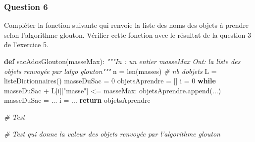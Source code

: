 \documentclass[
  paper=a4,
  ,captions=tableheading
]{scrartcl}
\newenvironment{Shaded}{}{}
\newcommand{\BuiltInTok}[1]{\textcolor[rgb]{0.00,0.50,0.00}{#1}}
\newcommand{\CommentTok}[1]{\textcolor[rgb]{0.38,0.63,0.69}{\textit{#1}}}
\newcommand{\ControlFlowTok}[1]{\textcolor[rgb]{0.00,0.44,0.13}{\textbf{#1}}}
\newcommand{\DecValTok}[1]{\textcolor[rgb]{0.25,0.63,0.44}{#1}}
\newcommand{\KeywordTok}[1]{\textcolor[rgb]{0.00,0.44,0.13}{\textbf{#1}}}
\newcommand{\NormalTok}[1]{#1}
\newcommand{\OperatorTok}[1]{\textcolor[rgb]{0.40,0.40,0.40}{#1}}
\newcommand{\StringTok}[1]{\textcolor[rgb]{0.25,0.44,0.63}{#1}}
\begin{document}
\hypertarget{question-6}{%
\subsubsection{Question 6}\label{question-6}}

Compléter la fonction suivante qui renvoie la liste des noms des objets
à prendre selon l'algorithme glouton. Vérifier cette fonction avec le
résultat de la question 3 de l'exercice 5.

\begin{Shaded}
\begin{Highlighting}[]
\KeywordTok{def}\NormalTok{ sacAdosGlouton(masseMax):}
    \CommentTok{"""In : un entier masseMax}
\CommentTok{    Out: la liste des objets renvoyée par l\textquotesingle{}algo glouton"""}
\NormalTok{    n }\OperatorTok{=} \BuiltInTok{len}\NormalTok{(masses)  }\CommentTok{\# nb d\textquotesingle{}objets}
\NormalTok{    L }\OperatorTok{=}\NormalTok{ listeDictionnaires()}
\NormalTok{    masseDuSac }\OperatorTok{=} \DecValTok{0}
\NormalTok{    objetsAprendre }\OperatorTok{=}\NormalTok{ []}
\NormalTok{    i }\OperatorTok{=} \DecValTok{0}
    \ControlFlowTok{while}\NormalTok{ masseDuSac }\OperatorTok{+}\NormalTok{ L[i][}\StringTok{"masse"}\NormalTok{] }\OperatorTok{\textless{}=}\NormalTok{ masseMax:}
\NormalTok{        objetsAprendre.append(...)}
\NormalTok{        masseDuSac }\OperatorTok{=}\NormalTok{ ...}
\NormalTok{        i }\OperatorTok{=}\NormalTok{ ...}
    \ControlFlowTok{return}\NormalTok{ objetsAprendre}
\end{Highlighting}
\end{Shaded}

\begin{Shaded}
\begin{Highlighting}[]
\CommentTok{\# Test}
\end{Highlighting}
\end{Shaded}

\begin{Shaded}
\begin{Highlighting}[]
\CommentTok{\# Test qui donne la valeur des objets renvoyée par l’algorithme glouton}
\end{Highlighting}
\end{Shaded}
\end{document}
